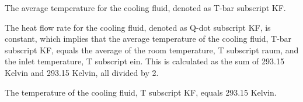 The average temperature for the cooling fluid, denoted as T-bar subscript KF.

The heat flow rate for the cooling fluid, denoted as Q-dot subscript KF, is constant, which implies that the average temperature of the cooling fluid, T-bar subscript KF, equals the average of the room temperature, T subscript raum, and the inlet temperature, T subscript ein. This is calculated as the sum of 293.15 Kelvin and 293.15 Kelvin, all divided by 2.

The temperature of the cooling fluid, T subscript KF, equals 293.15 Kelvin.